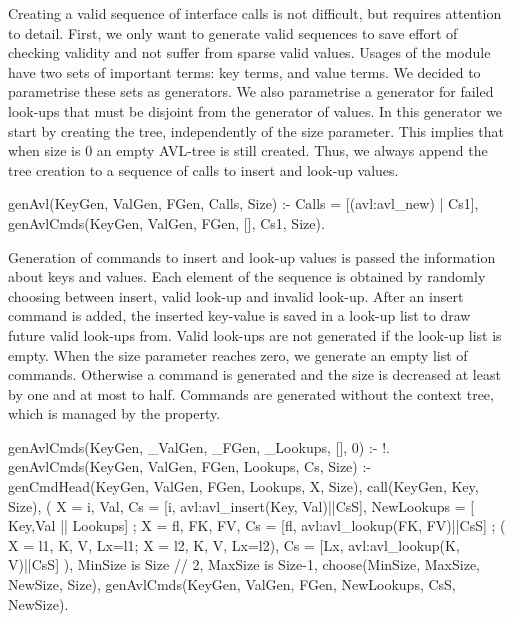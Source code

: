 \documentclass[11pt]{article}
\begin{document}

Creating a valid sequence of interface calls is not difficult, but
requires attention to detail.
%
First, we only want to generate valid sequences
%
to save effort of checking validity and not suffer
from sparse valid values.
%
Usages of the module have two sets of important terms: key
terms, and value terms.
%
We decided to parametrise these sets as generators.
%
We also parametrise a
generator for failed look-ups that must be disjoint from the generator
of values.
%
In this generator we start by creating the tree, independently of the
size parameter.
%
This implies that when size is 0 an empty AVL-tree is still created.
%
Thus, we always append the tree creation to a sequence of calls to insert and look-up
values.
%
\begin{yapcode}
 genAvl(KeyGen, ValGen, FGen, Calls, Size) :-
   Calls = [(avl:avl_new) | Cs1], genAvlCmds(KeyGen, ValGen, FGen, [], Cs1, Size).
\end{yapcode}


Generation of commands to insert and look-up values is passed the
information about keys and values.
%
Each element of the sequence is obtained by randomly choosing between insert, valid look-up and invalid
look-up.
%
After an insert command is added, the inserted key-value is saved in a
look-up list to draw future valid look-ups from.
%
Valid look-ups are not generated if the look-up list is empty.
%
When the size parameter reaches zero, we generate an empty list of
commands.
%
Otherwise a command is generated and the size is decreased at least by
one and at most to half.
%
Commands are generated without the context tree, which is managed by
the property.
%
\begin{yapcode}
 genAvlCmds(KeyGen, _ValGen, _FGen, _Lookups, [], 0) :- !.
 genAvlCmds(KeyGen, ValGen, FGen, Lookups, Cs, Size) :-
   genCmdHead(KeyGen, ValGen, FGen, Lookups, X, Size), call(KeyGen, Key, Size),
   ( X = {i, Val}, Cs = [{i, avl:avl_insert(Key, Val)}||CsS],
     NewLookups = [ {Key,Val} || Lookups]
   ; X = {fl, {FK, FV}}, Cs = [{fl, avl:avl_lookup(FK, FV)}||CsS]
   ; ( X = {l1, {K, V}}, Lx=l1; X = {l2, {K, V}}, Lx=l2),
     Cs = [{Lx, avl:avl_lookup(K, V)}||CsS] ),
   MinSize is Size // 2, MaxSize is Size-1, choose(MinSize, MaxSize, NewSize, Size),
   genAvlCmds(KeyGen, ValGen, FGen, NewLookups, CsS, NewSize).
\end{yapcode}
\end{document}

